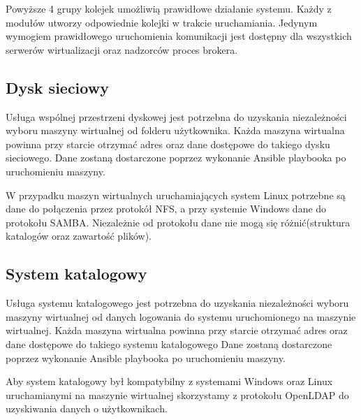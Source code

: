 \documentclass[../deliverable-two.tex]{subfiles}
\begin{document}
Powyższe 4 grupy kolejek umożliwią prawidłowe działanie systemu.
Każdy z modułów utworzy odpowiednie kolejki w trakcie uruchamiania.
Jedynym wymogiem prawidłowego uruchomienia komunikacji jest dostępny dla wszystkich serwerów wirtualizacji oraz nadzorców proces brokera.

\subsection{Dysk sieciowy}
Usługa wspólnej przestrzeni dyskowej jest potrzebna do uzyskania niezależności wyboru maszyny wirtualnej od folderu użytkownika.
Każda maszyna wirtualna powinna przy starcie otrzymać adres oraz dane dostępowe do takiego dysku sieciowego.
Dane zostaną dostarczone poprzez wykonanie Ansible playbooka po uruchomieniu maszyny.

W przypadku maszyn wirtualnych uruchamiających system Linux potrzebne są dane do połączenia przez protokół NFS, a przy systemie Windows dane do protokołu SAMBA.
Niezależnie od protokołu dane nie mogą się różnić(struktura katalogów oraz zawartość plików).

\subsection{System katalogowy}
Usługa systemu katalogowego jest potrzebna do uzyskania niezależności wyboru maszyny wirtualnej od danych logowania do systemu uruchomionego na maszynie wirtualnej.
Każda maszyna wirtualna powinna przy starcie otrzymać adres oraz dane dostępowe do takiego systemu katalogowego
Dane zostaną dostarczone poprzez wykonanie Ansible playbooka po uruchomieniu maszyny.

Aby system katalogowy był kompatybilny z systemami Windows oraz Linux uruchamianymi na maszynie wirtualnej skorzystamy z protokołu OpenLDAP do uzyskiwania danych o użytkownikach.
\end{document}
